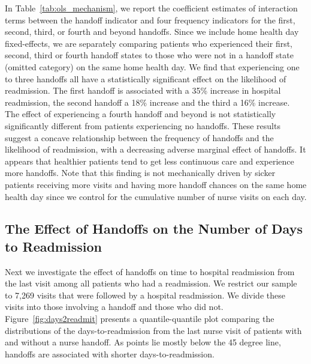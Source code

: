 \documentclass[final,12pt, notitlepage]{article}
\begin{document}
In Table~\ref{tab:ols_mechanism}, we report the coefficient estimates of interaction terms between the handoff indicator and four frequency indicators for the first, second, third, or fourth and beyond handoffs.
Since we include home health day fixed-effects, we are separately comparing patients who experienced their first, second, third or fourth handoff states to those who were not in a handoff state (omitted category) on the same home health day.
We find that experiencing one to three handoffs all have a statistically significant effect on the likelihood of readmission. The first handoff is associated with a 35\% increase in hospital readmission, the second handoff a 18\% increase and the third a 16\% increase.
The effect of experiencing a fourth handoff and beyond is not statistically significantly different from patients experiencing no handoffs.
These results suggest a concave relationship between the frequency of handoffs and the likelihood of readmission, with a decreasing adverse marginal effect of handoffs. It appears that healthier patients tend to get less continuous care and experience more handoffs.
Note that this finding is not mechanically driven by sicker patients receiving more visits and having more handoff chances on the same home health day since we control for the cumulative number of nurse visits on each day.

\subsection{The Effect of Handoffs on the Number of Days to Readmission}

Next we investigate the effect of handoffs on time to hospital readmission from the last visit among all patients who had a readmission. We restrict our sample to 7,269 visits that were followed by a hospital readmission. We divide these visits into those involving a handoff and those who did not. Figure~\ref{fig:days2readmit} presents a quantile-quantile plot comparing the distributions of the days-to-readmission from the last nurse visit of patients with and without a nurse handoff. As points lie mostly below the 45 degree line, handoffs are associated with shorter days-to-readmission.
\end{document}
